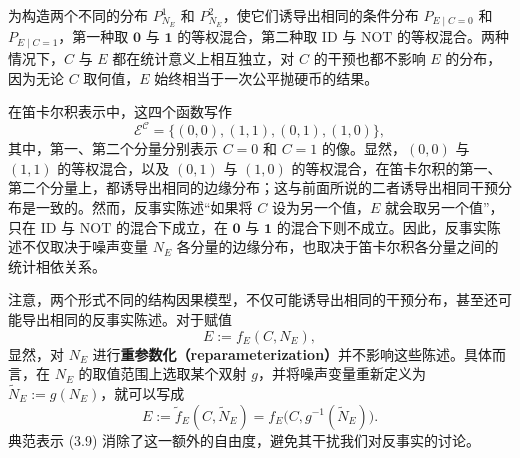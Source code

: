 为构造两个不同的分布 $P_{N_E}^{1}$ 和 $P_{N_E}^{2}$，使它们诱导出相同的条件分布 $P_{E\mid C=0}$ 和 $P_{E\mid C=1}$，第一种取 $\mathbf{0}$ 与 $\mathbf{1}$ 的等权混合，第二种取 $\mathrm{ID}$ 与 $\mathrm{NOT}$ 的等权混合。两种情况下，$C$ 与 $E$ 都在统计意义上相互独立，对 $C$ 的干预也都不影响 $E$ 的分布，因为无论 $C$ 取何值，$E$ 始终相当于一次公平抛硬币的结果。

在笛卡尔积表示中，这四个函数写作
\[
 \mathcal{E}^{\mathcal{C}}=\{(0,0),(1,1),(0,1),(1,0)\},
\]
其中，第一、第二个分量分别表示 $C=0$ 和 $C=1$ 的像。显然，$(0,0)$ 与 $(1,1)$ 的等权混合，以及 $(0,1)$ 与 $(1,0)$ 的等权混合，在笛卡尔积的第一、第二个分量上，都诱导出相同的边缘分布；这与前面所说的二者诱导出相同干预分布是一致的。然而，反事实陈述“如果将 $C$ 设为另一个值，$E$ 就会取另一个值”，只在 $\mathrm{ID}$ 与 $\mathrm{NOT}$ 的混合下成立，在 $\mathbf{0}$ 与 $\mathbf{1}$ 的混合下则不成立。因此，反事实陈述不仅取决于噪声变量 $N_E$ 各分量的边缘分布，也取决于笛卡尔积各分量之间的统计相依关系。

注意，两个形式不同的结构因果模型，不仅可能诱导出相同的干预分布，甚至还可能导出相同的反事实陈述。对于赋值
\[
 E:=f_E(C,N_E),
\]
显然，对 $N_E$ 进行\textbf{重参数化（reparameterization）}并不影响这些陈述。具体而言，在 $N_E$ 的取值范围上选取某个双射 $g$，并将噪声变量重新定义为 $\widetilde N_E:=g(N_E)$，就可以写成
\[
 E:=\widetilde f_E(C,\widetilde N_E)
   =f_E\bigl(C,g^{-1}(\widetilde N_E)\bigr).
\]
典范表示 (3.9) 消除了这一额外的自由度，避免其干扰我们对反事实的讨论。
